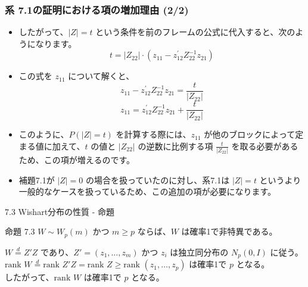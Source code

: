 \documentclass{beamer}
\begin{document}
\begin{frame}
\frametitle{系 7.1の証明における項の増加理由 (2/2)}
\begin{itemize}
    \item したがって、$|Z|=t$ という条件を前のフレームの公式に代入すると、次のようになります。
    \[ t=|Z_{22}|\cdot(z_{11}-z_{12}^{\prime}Z_{22}^{-1}z_{21}) \]
    \item この式を $z_{11}$ について解くと、
    \[ z_{11}-z_{12}^{\prime}Z_{22}^{-1}z_{21}=\frac{t}{|Z_{22}|} \]
    \[ z_{11}=z_{12}^{\prime}Z_{22}^{-1}z_{21}+\frac{t}{|Z_{22}|} \]
    \item このように、$P(|Z|=t)$ を計算する際には、$z_{11}$ が他のブロックによって定まる値に加えて、$t$ の値と $|Z_{22}|$ の逆数に比例する項 $\frac{t}{|Z_{22}|}$ を取る必要があるため、この項が増えるのです。
    \item 補題7.1が $|Z|=0$ の場合を扱っていたのに対し、系7.1は $|Z|=t$ というより一般的なケースを扱っているため、この追加の項が必要になります。
\end{itemize}
\end{frame}

\begin{frame}{7.3 Wishart分布の性質 - 命題}
\begin{block}{命題 7.3}
$W \sim W_p(m)$ かつ $m \ge p$ ならば、$W$ は確率1で非特異である。
\end{block}

$W \overset{d}{=} Z'Z$ であり、$Z' = (z_1, \dots, z_m)$ かつ $z_i$ は独立同分布の $N_p(0, I)$ に従う。\\
$\text{rank } W \overset{d}{=} \text{rank } Z'Z = \text{rank } Z \ge \text{rank } (z_1, \dots, z_p)$ は確率1で $p$ となる。\\
したがって、$\text{rank } W$ は確率1で $p$ となる。
\end{frame}
\end{document}
